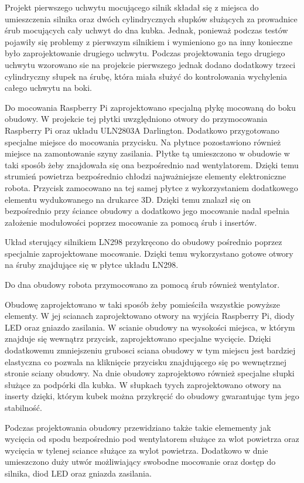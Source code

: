 Projekt pierwszego uchwytu mocującego silnik składał się z miejsca do umieszczenia silnika oraz dwóch cylindrycznych słupków służących za prowadnice
śrub mocujących cały uchwyt do dna kubka. Jednak, ponieważ podczas testów pojawiły się problemy z pierwszym silnikiem i wymieniono go na inny konieczne
było zaprojektowanie drugiego uchwytu. Podczas projektowania tego drugiego uchwytu wzorowano sie na projekcie pierwszego jednak dodano dodatkowy trzeci
cylindryczny słupek na śrubę, która miała służyć do kontrolowania wychylenia całego uchwytu na boki. 

Do mocowania Raspberry Pi zaprojektowano specjalną płykę mocowaną do boku obudowy. W projekcie tej płytki uwzględniono otwory do przymocowania Raspberry
Pi oraz układu ULN2803A Darlington. Dodatkowo przygotowano specjalne miejsce do mocowania przycisku. Na płytnce pozostawiono również miejsce
na zamontowanie szyny zasilania. Płytke tą umieszczono w obudowie w taki sposób żeby znajdowała się ona bezpośrednio nad wentylatorem. Dzięki temu
strumień powietrza bezpośrednio chłodzi najważniejsze elementy elektroniczne robota. Przycisk zamocowano na tej samej płytce z wykorzystaniem
dodatkowego elementu wydukowanego na drukarce 3D. Dzięki temu znalazł się on bezpośrednio przy ściance obudowy a dodatkowo jego mocowanie
nadal spełnia założenie modułowości poprzez mocowanie za pomocą śrub i insertów.

Układ sterujący silnikiem LN298 przykręcono do obudowy pośrednio poprzez specjalnie zaprojektowane mocowanie. Dzięki temu wykorzystano
gotowe otwory na śruby znajdujące się w płytce układu LN298.

Do dna obudowy robota przymocowano za pomocą śrub również wentylator.

Obudowę zaprojektowano w taki sposób żeby pomieściła wszystkie powyższe elementy. W jej scianach zaprojektowano otwory na wyjścia Raspberry Pi, 
diody LED oraz gniazdo zasilania. W scianie obudowy na wysokości miejsca, w którym znajduje się wewnątrz przycisk, zaprojektowano specjalne wycięcie.
Dzięki dodatkowemu zmniejszeniu grubosci sciana obudowy w tym miejscu jest bardziej elastyczna co pozwala na kliknięcie przycisku znajdującego
się po wewnętrznej stronie sciany obudowy. Na dnie obudowy zaprojektowo również specjalne słupki służące za podpórki dla kubka. 
W słupkach tyych zaprojektowano otwory na inserty dzięki, którym kubek można przykręcić do obudowy gwarantując tym jego stabilność.

Podczas projektowania obudowy przewidziano także takie elemementy jak wycięcia od spodu bezpośrednio pod wentylatorem służące za wlot powietrza 
oraz wycięcia w tylenej sciance służące za wylot powietrza. Dodatkowo w dnie umieszczono duży utwór możliwiający swobodne mocowanie oraz dostęp do 
silnika, diod LED oraz gniazda zasilania.

